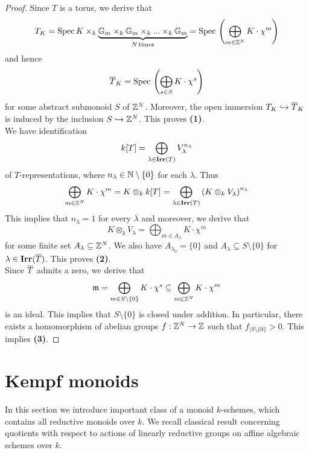 \begin{proof}
Since $T$ is a torus, we derive that
$$T_K = \mathrm{Spec}\, K \times_k \underbrace{\mathbb{G}_{m}\times_k \mathbb{G}_{m}\times_k ...\times_k \mathbb{G}_{m}}_{N\,\mathrm{times}} = \mathrm{Spec}\, \left(\bigoplus_{m\in {\mathbb Z}^N}K\cdot \chi^m\right)$$
and hence
$$\overline{T}_K = \mathrm{Spec}\, \left(\bigoplus_{s\in S}K\cdot \chi^s\right)$$
for some abstract submonoid $S$ of ${\mathbb Z}^N$. Moreover, the open immersion $T_K\hookrightarrow \overline{T}_K$ is induced by the inclusion $S \hookrightarrow {\mathbb Z}^N$. This proves \textbf{(1)}.\\
We have identification
$$k[T] = \bigoplus_{\lambda\in \mathbf{Irr}(T)}V_{\lambda}^{n_{\lambda}}$$
of $T$-representations, where $n_{\lambda}\in {\mathbb N}\setminus \{0\}$ for each $\lambda$. Thus
$$\bigoplus_{m\in {\mathbb Z}^N}K\cdot \chi^m = K\otimes_kk[T] = \bigoplus_{\lambda\in \mathbf{Irr}(T)}\left(K\otimes_kV_{\lambda}\right)^{n_{\lambda}}$$
This implies that $n_{\lambda} = 1$ for every $\lambda$ and moreover, we derive that
$$K\otimes_kV_{\lambda} = \bigoplus_{m\in A_{\lambda}}K\cdot \chi^m$$
for some finite set $A_{\lambda}\subseteq {\mathbb Z}^N$. We also have $A_{\lambda_0} = \{0\}$ and $A_{\lambda}\subseteq S\setminus \{0\}$ for $\lambda \in \mathbf{Irr}(\overline{T})$. This proves \textbf{(2)}.\\
Since $\overline{T}$ admits a zero, we derive that
$$\mathfrak{m} = \bigoplus_{m \in S\setminus\{0\}}K\cdot \chi^s \subseteq \bigoplus_{m\in {\mathbb Z}^N}K\cdot \chi^m$$
is an ideal. This implies that $S\setminus \{0\}$ is closed under addition. In particular, there exists a homomorphism of abelian groups $f:{\mathbb Z}^N\rightarrow {\mathbb Z}$ such that $f_{\mid S\setminus \{0\}}>0$. This implies \textbf{(3)}.
\end{proof}

\section{Kempf monoids}
\noindent
In this section we introduce important class of a monoid $k$-schemes, which contains all reductive monoids over $k$. We recall classical result concerning quotients with respect to actions of linearly reductive groups on affine algebraic schemes over $k$.

